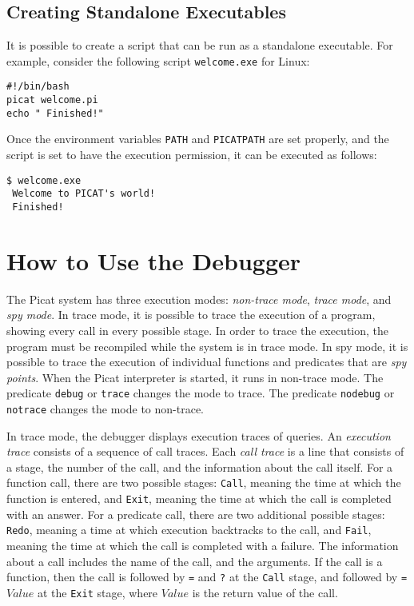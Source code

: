 \subsection{Creating Standalone Executables}
It is possible to create a script that can be run as a standalone executable. For example, consider the following script \texttt{welcome.exe} for Linux:

\begin{verbatim}
#!/bin/bash          
picat welcome.pi
echo " Finished!"
\end{verbatim}
Once the environment variables \texttt{PATH} and \texttt{PICATPATH} are set properly, and the script is set to have the execution permission, it can be executed as follows:

\begin{verbatim}
$ welcome.exe 
 Welcome to PICAT's world! 
 Finished!
\end{verbatim}

\section{How to Use the Debugger}
The Picat system has three execution modes: \textit{non-trace mode}, \textit{trace mode}, and \textit{spy mode}.  In trace mode, it is possible to trace the execution of a program, showing every call in every possible stage.  In order to trace the execution, the program must be recompiled while the system is in trace mode.  In spy mode, it is possible to trace the execution of individual functions and predicates that are {\it spy points}. When the Picat interpreter is started, it runs in non-trace mode. The predicate \texttt{debug} or \texttt{trace}  changes the mode to trace. The predicate \texttt{nodebug} or \texttt{notrace} changes the mode to non-trace.

In trace mode, the debugger displays execution traces of queries. An \emph{execution trace} consists of a sequence of call traces. Each \emph{call trace} is a line that consists of a stage, the number of the call, and the information about the call itself. For a function call, there are two possible stages: \texttt{Call}, meaning the time at which the function is entered, and \texttt{Exit},  meaning the time at which the call is completed with an answer. For a predicate call, there are two additional possible stages: \texttt{Redo}, meaning a time at which execution backtracks to the call, and \texttt{Fail}, meaning the time at which the call is completed with a failure. The information about a call includes the name of the call, and the arguments. If the call is a function, then the call is followed by \texttt{=} and \texttt{?} at the \texttt{Call} stage, and followed by \texttt{= $Value$} at the \texttt{Exit} stage, where $Value$ is the return value of the call. 

